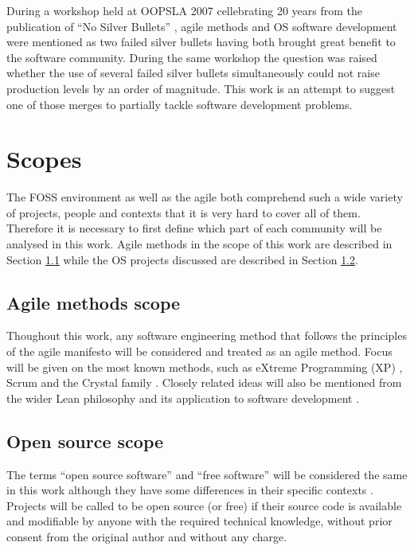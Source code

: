 \documentclass[lnbip]{svmultln}
\begin{document}
During a workshop \cite{conference:oopsla2007} held at OOPSLA 2007
cellebrating 20 years from the publication of ``No Silver Bullets''
\cite{brooks1987}, agile methods and OS software development were
mentioned as two failed silver bullets having both brought great
benefit to the software community. During the same workshop the
question was raised whether the use of several failed silver bullets
simultaneously could not raise production levels by an order of
magnitude. This work is an attempt to suggest one of those merges to
partially tackle software development problems.


\section{Scopes}
\label{sec:scope}

The FOSS environment as well as the agile both comprehend such a wide
variety of projects, people and contexts that it is very hard to cover
all of them. Therefore it is necessary to first define which part of
each community will be analysed in this work. Agile methods in the
scope of this work are described in Section \ref{subsec:agile-scope}
while the OS projects discussed are described in Section
\ref{subsec:os-scope}.

\subsection{Agile methods scope}
\label{subsec:agile-scope}

Thoughout this work, any software engineering method that follows the
principles of the agile manifesto \cite{url:agilemanifesto} will be
considered and treated as an agile method. Focus will be given on the
most known methods, such as eXtreme Programming (XP) \cite{XP2002},
Scrum \cite{schwaber2004} and the Crystal family
\cite{cockburn2002}. Closely related ideas will also be mentioned from
the wider Lean philosophy \cite{ohno1998} and its application to
software development \cite{poppendieck2005}.

\subsection{Open source scope}
\label{subsec:os-scope}

The terms ``open source software'' and ``free software'' will be
considered the same in this work although they have some differences
in their specific contexts \cite[Ch. 1, Free Versus Open
source]{fogel2005}. Projects will be called to be open source (or
free) if their source code is available and modifiable by anyone with
the required technical knowledge, without prior consent from the
original author and without any charge.
\end{document}
